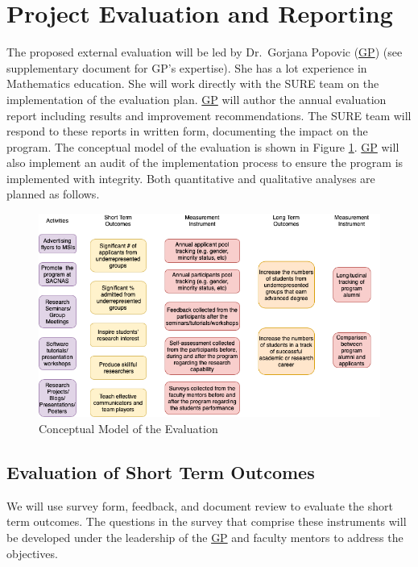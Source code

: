 \documentclass[11pt]{NSFamsart}
\newcommand{\GP}{\hyperlink{GPlink}{GP}\xspace}
\begin{document}
\section{Project Evaluation and Reporting}
The proposed external evaluation will be led by \hypertarget{GPlink}{Dr.~Gorjana Popovic} (\GP) (see supplementary document for
GP’s expertise). She has a lot experience in Mathematics education. She will work directly with the SURE team on the implementation of the evaluation
plan.  \GP will author the annual evaluation report including results and improvement recommendations. The SURE team will respond to these reports in written form, documenting
the impact on the program. The conceptual model of the evaluation is shown in Figure \ref{fig:my_label}. \GP will also implement an audit of the implementation process
to ensure the program is implemented with integrity. Both quantitative and qualitative analyses are
planned as follows.

\begin{figure}[tbh]
    \centering
    \includegraphics[width = 14cm]{EvaluationPlan.png}
    \caption{Conceptual Model of the Evaluation}
    \label{fig:my_label}
\end{figure}

\subsection{Evaluation of Short Term Outcomes}

We will use survey form, feedback, and document review to evaluate the short term outcomes. The questions in the survey that comprise these instruments will be developed under the leadership of the \GP and faculty mentors to address the objectives.
\end{document}
